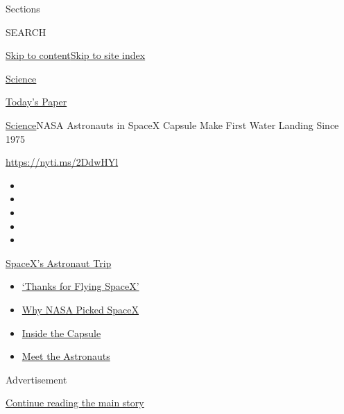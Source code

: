 Sections

SEARCH

\protect\hyperlink{site-content}{Skip to
content}\protect\hyperlink{site-index}{Skip to site index}

\href{https://www.nytimes.com/section/science}{Science}

\href{https://myaccount.nytimes.com/auth/login?response_type=cookie\&client_id=vi}{}

\href{https://www.nytimes.com/section/todayspaper}{Today's Paper}

\href{/section/science}{Science}\textbar{}NASA Astronauts in SpaceX
Capsule Make First Water Landing Since 1975

\url{https://nyti.ms/2DdwHYl}

\begin{itemize}
\item
\item
\item
\item
\item
\end{itemize}

\href{https://www.nytimes.com/2020/08/02/science/spacex-astronauts-splashdown.html?action=click\&pgtype=Article\&state=default\&region=TOP_BANNER\&context=storylines_menu}{SpaceX's
Astronaut Trip}

\begin{itemize}
\tightlist
\item
  \href{https://www.nytimes.com/2020/08/02/science/spacex-astronauts-splashdown.html?action=click\&pgtype=Article\&state=default\&region=TOP_BANNER\&context=storylines_menu}{`Thanks
  for Flying SpaceX'}
\item
  \href{https://www.nytimes.com/2020/05/26/science/spacex-launch-nasa.html?action=click\&pgtype=Article\&state=default\&region=TOP_BANNER\&context=storylines_menu}{Why
  NASA Picked SpaceX}
\item
  \href{https://www.nytimes.com/interactive/2020/05/26/science/spacex-nasa.html?action=click\&pgtype=Article\&state=default\&region=TOP_BANNER\&context=storylines_menu}{Inside
  the Capsule}
\item
  \href{https://www.nytimes.com/2020/05/27/science/bob-behnken-doug-hurley.html?action=click\&pgtype=Article\&state=default\&region=TOP_BANNER\&context=storylines_menu}{Meet
  the Astronauts}
\end{itemize}

Advertisement

\protect\hyperlink{after-top}{Continue reading the main story}

